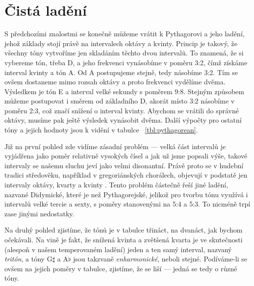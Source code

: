 \documentclass[12pt]{article}
\begin{document}
\pagebreak

\section{Čistá ladění}

S předchozími znalostmi se konečně můžeme vrátit k Pythagorovi a jeho ladění, jehož základy stojí právě na intervalech oktávy a kvinty. Princip je takový, že všechny tóny vytvoříme jen skladáním těchto dvou intervalů. To znamená, že si vybereme tón, třeba D, a jeho frekvenci vynásobíme v poměru 3:2, čímž získáme interval kvinty a tón A. Od A postupujeme stejně, tedy násobíme 3:2. Tím se ovšem dostaneme mimo rozsah oktávy a proto frekvenci vydělíme dvěma. Výsledkem je tón E a interval velké sekundy s poměrem 9:8.
Stejným způsobem můžeme postupovat i směrem  od základního D, akorát místo 3:2 násobíme v poměru 2:3, což značí snížení o interval kvinty. Abychom se vrátili do správné oktávy, musíme pak ještě výsledek vynásobit dvěma. Další výpočty pro ostatní tóny a jejich hodnoty jsou k vidění v tabulce ~\ref{tbl:pythagorean}. 

Již na první pohled zde vidíme zásadní problém — velká část intervalů je vyjádřena jako poměr relativně vysokých čísel a jak už jsme popsali výše, takové intervaly se našemu sluchu jeví jako velmi disonantní. Právě proto se v hudební tradici středověku, například v gregoriánských chorálech, objevují v podstatě jen intervaly oktávy, kvarty a kvinty \cite{smolka}. Tento problém částečně řeší jiné ladění, nazvané Didymické, které je  než Pythagorejské, jelikož pro tvorbu tónu využívá i intervalů velké tercie a sexty, s poměry stanovenými na 5:4 a 5:3. To nicméně trpí zase jinými nedostatky.

Na druhý pohled zjistíme, že tónů je v tabulce třináct, na dvanáct, jak bychom očekávali. Na vině je fakt, že snížená kvinta a zvětšená kvarta je ve skutečnosti (alespoň v našem temperovaném ladění) jeden a ten samý interval, nazvaný \emph{tritón}, a tóny G$\sharp$ a A$\flat$ jsou takzvaně \emph{enharmonické}, neboli stejné. Podíváme-li se ovšem na jejich poměry v tabulce, zjistíme, že se liší — jedná se tedy o různé tóny.
\end{document}
